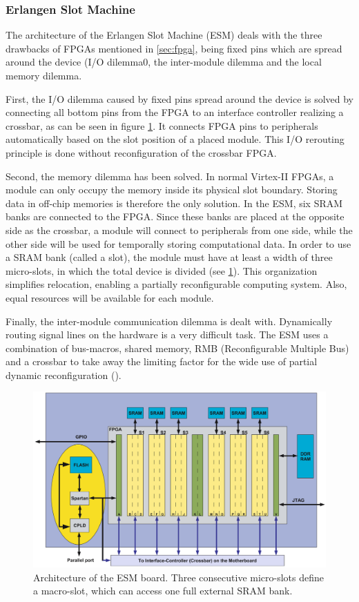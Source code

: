 \subsubsection{Erlangen Slot Machine}
The architecture of \cite{erlangen} the Erlangen Slot Machine (ESM) deals with the three drawbacks of FPGAs mentioned in \ref{sec:fpga}, being fixed pins which are spread around the device (I/O dilemma0, the inter-module dilemma and the local memory dilemma. 

First, the I/O dilemma caused by fixed pins spread around the device is solved by connecting all bottom pins from the FPGA to an interface controller realizing a crossbar, as can be seen in figure \ref{fig:erlangen}. It connects FPGA pins to peripherals automatically based on the slot position of a placed module. This I/O rerouting principle is done without reconfiguration of the crossbar FPGA.

Second, the memory dilemma has been solved. In normal Virtex-II FPGAs, a module can only occupy the memory inside its physical slot boundary. Storing data in off-chip memories is therefore the only solution. In the ESM, six SRAM banks are connected to the FPGA. Since these banks are placed at the opposite side as the crossbar, a module will connect to peripherals from one side, while the other side will be used for temporally storing computational data. In order to use a SRAM bank (called a slot), the module must have at least a width of three micro-slots, in which the total device is divided (see \ref{fig:erlangen}). This organization simplifies relocation, enabling a partially reconfigurable computing system. Also, equal resources will be available for each module.

Finally, the inter-module communication dilemma is dealt with. Dynamically routing signal lines on the hardware is a very difficult task. The ESM uses a combination of bus-macros, shared memory, RMB (Reconfigurable Multiple Bus) and a crossbar to take away the limiting factor for the wide use of partial dynamic reconfiguration (\cite{erlangen}).


\begin{figure}[htb]%
\includegraphics[width=\columnwidth]{Pictures/erlangen}%
\caption{Architecture of the ESM board. Three consecutive micro-slots define a macro-slot, which can access one full external SRAM bank.}%
\label{fig:erlangen}%
\end{figure}
